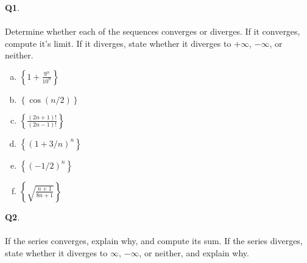 \documentclass[12pt, oneside]{amsart}
\begin{document}
\vfill


\newpage
\noindent
\textbf{Q1}.\\ \\ Determine whether each of the sequences converges or diverges. If it converges, compute it's limit. If it diverges, state whether it diverges to $+\infty$, $-\infty$, or neither. \\

\begin{enumerate}[a)]
  \item
     $ \left\{ 1 + \displaystyle{\frac{9^{n}}{10^{n}}} \right\}$
     \vspace{6cm}
   \item
     $\left\{ \cos(n/2) \right\}$
     \vspace{6cm}
   \item
     $\left\{ \displaystyle{\frac{(2n+1)!}{(2n-1)!}} \right\}$
\newpage
  \item
     $ \left\{ (1 + 3/n)^{n} \right\}$
     \vspace{6cm}
   \item
     $\left\{ (-1/2)^{n}\right\}$
     \vspace{6cm}
   \item
     $\left\{ \displaystyle{\sqrt{\frac{n+1}{8n+1}}} \right\}$
   \end{enumerate}
\newpage
\noindent
\textbf{Q2}. \\ \\ If the series converges, explain why, and compute its sum. If the series diverges, state whether it diverges to $\infty$, $-\infty$, or neither, and explain why.
\end{document}
